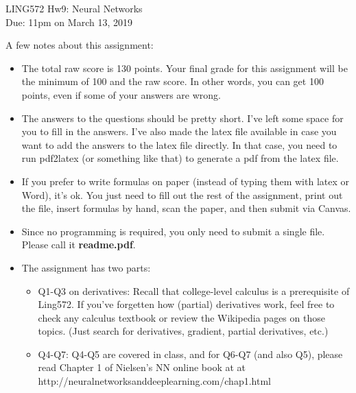 \documentclass[11pt]{article}
\begin{document}
\begin{center}
\LARGE
LING572 Hw9: Neural Networks\\
Due: 11pm on March 13, 2019\\
\vspace{0.3in}
\end{center}

A few notes about this assignment:
\begin{itemize}
 \item The total raw score is 130 points. Your final grade for this assignment
   will be the minimum of 100 and the raw score. In other words, you can get
   100 points, even if some of your answers are wrong.

 \item The answers to the questions should be pretty short. I've left some space for you to fill in the answers. I've also made the latex file available in case you want to add the answers to the latex file directly. In that case, you need to run pdf2latex (or something like that) to generate a pdf from the latex file.

 \item If you prefer to write formulas on paper (instead of typing them with latex or Word), it's ok. You just need to fill out the rest of the assignment, print out the file, insert formulas by hand, scan the paper, and then submit via Canvas.

 \item Since no programming is required, you only need to submit a single
     file. Please call it {\bf readme.pdf}.

  \item The assignment has two parts:
    \begin{itemize}
    \item Q1-Q3 on derivatives: Recall that college-level calculus is
      a prerequisite of Ling572. If you've forgetten how (partial) derivatives work,
      feel free to check any calculus textbook or review the Wikipedia pages
      on those topics. (Just search for derivatives, gradient, partial derivatives,
      etc.)

    \item Q4-Q7: Q4-Q5 are covered in class, and for Q6-Q7 (and also Q5),
      please read
      Chapter 1 of Nielsen's NN online book at 
      at http://neuralnetworksanddeeplearning.com/chap1.html
    \end{itemize}
    
\end{itemize}
\end{document}
